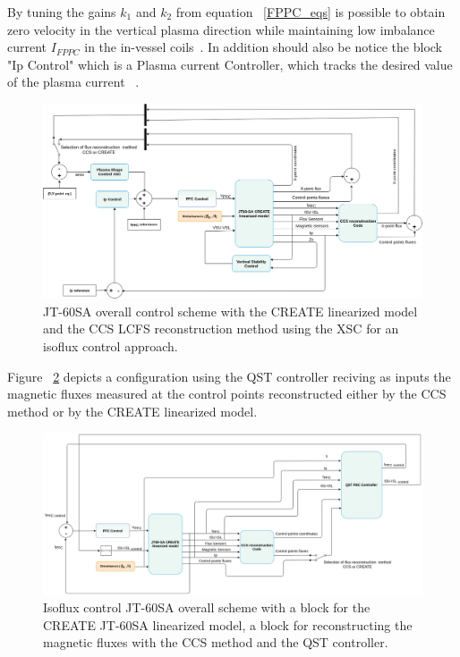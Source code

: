  By tuning the gains $k_1$ and $k_2$ from equation ~\ref{FPPC_eqs} is possible to obtain zero velocity in the vertical plasma direction while maintaining low imbalance current $  I_{FPPC} $ in the in-vessel coils~\cite[Sec.~4.1]{NCruz}.  In addition should also be notice the block "Ip Control" which is a Plasma current Controller, which tracks the desired value of the plasma current ~\cite{de2014shape}.

 
 
\begin{figure}
	\centering
	\includegraphics[width=1.05\textwidth]{Chp3/JT60Schemes1.png}
	\caption{	\label{JT60controlscheme}JT-60SA overall control scheme with the CREATE linearized model and the CCS LCFS reconstruction method  using the XSC for an isoflux control approach.}
\end{figure}

Figure ~\ref{JT60FBCcheme} depicts a configuration using the QST controller reciving as inputs the magnetic fluxes measured at the control points reconstructed either by the CCS method or by the CREATE linearized model.
\smallskip
 
\begin{figure}
	\centering
	\includegraphics[width=1.05\textwidth]{Chp3/JT60SchemeFBCnew.png}
	\caption{	\label{JT60FBCcheme} Isoflux control JT-60SA overall scheme with  a block for the  CREATE JT-60SA linearized model, a block for reconstructing  the magnetic fluxes with the CCS method and the QST controller. }
\end{figure}



